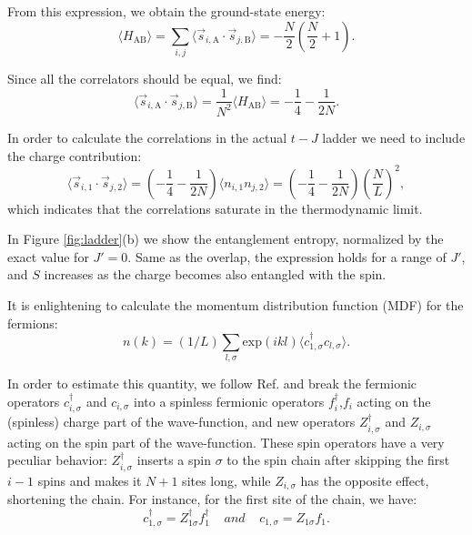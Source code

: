 \documentclass[article,11pt]{revtex4}
\begin{document}
From this expression, we obtain the ground-state energy:
\[
\langle H_\mathrm{AB}\rangle = \sum_{i,j} \langle \vec{s}_{i,\mathrm{A}}\cdot \vec{s}_{j,\mathrm{B}}\rangle = -\frac{N}{2}\left(\frac{N}{2}+1\right).
\]

Since all the correlators should be equal, we find:
\[
\langle \vec{s}_{i,\mathrm{A}}\cdot \vec{s}_{j,\mathrm{B}}\rangle = \frac{1}{N^2} \langle H_\mathrm{AB}\rangle = -\frac{1}{4}-\frac{1}{2N}.
\]

In order to calculate the correlations in the actual $t-J$ ladder we need to include the charge contribution:
\[
\langle \vec{s}_{i,1} \cdot \vec{s}_{j,2} \rangle = (-\frac{1}{4}-\frac{1}{2N})\langle n_{i,1} n_{j,2} \rangle = (-\frac{1}{4}-\frac{1}{2N})\left(\frac{N}{L}\right)^2,
\]
which indicates that the correlations saturate in the thermodynamic limit.

In Figure \ref{fig:ladder}(b) we show the entanglement entropy, normalized by the exact value for $J'=0$. Same as the overlap, the expression holds for a range of $J'$, and $S$ increases as the charge becomes also entangled with the spin. 

It is enlightening to calculate the momentum distribution function (MDF) for the fermions:
\begin{equation}
n(k) = (1/L)\sum_{l,\sigma} \mbox{exp}(ikl)\langle c^\dagger_{1,\sigma}c_{l,\sigma}\rangle.
\label{nk}
\end{equation}

In order to estimate this quantity, we follow Ref. and break the fermionic operators $c^\dagger_{i,\sigma}$ and $c_{i,\sigma}$ into a spinless fermionic operators $f^\dagger_i$,$f_i$ acting on the (spinless) charge part of the wave-function, and new operators $Z^\dagger_{i,\sigma}$ and $Z_{i,\sigma}$ acting on the spin part of the wave-function. These spin operators have a very peculiar behavior: $Z^\dagger_{i,\sigma}$ inserts a spin $\sigma$ to the spin chain after skipping the first $i-1$ spins and makes it $N+1$ sites long, while $Z_{i,\sigma}$ has the opposite effect, shortening the chain. For instance, for the first site of the chain, we have:
\begin{equation}
c^\dagger_{1,\sigma}=Z^\dagger_{1\sigma}f^\dagger_1 \mspace{20mu} and \mspace{20mu} c_{1,\sigma}=Z_{1\sigma}f_1.
\end{equation}
\end{document}
